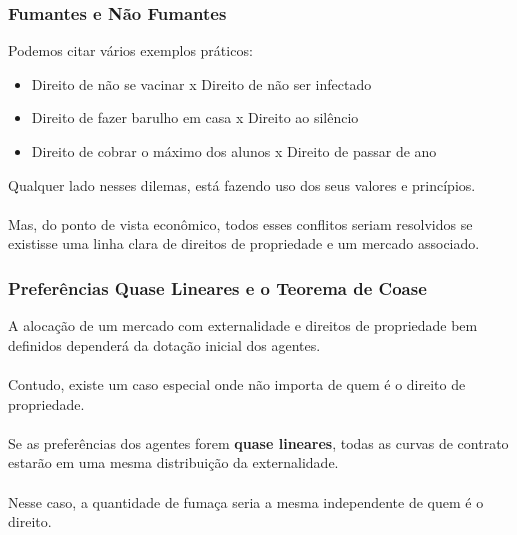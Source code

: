 \documentclass{beamer}[10]
\begin{document}
\begin{frame}
	\frametitle{Fumantes e Não Fumantes}

	Podemos citar vários exemplos práticos:
	\begin{itemize}
		\item Direito de não se vacinar x Direito de não ser infectado
		\item Direito de fazer barulho em casa x Direito ao silêncio
		\item Direito de cobrar o máximo dos alunos x Direito de passar de ano
	\end{itemize}

	Qualquer lado nesses dilemas, está fazendo uso dos seus valores e princípios.
	\\~\\
	Mas, do ponto de vista econômico, todos esses conflitos seriam resolvidos se existisse uma linha clara de direitos de propriedade e um mercado associado.

\end{frame}

\begin{frame}
	\frametitle{Preferências Quase Lineares e o Teorema de Coase}

	A alocação de um mercado com externalidade e direitos de propriedade bem definidos dependerá da dotação inicial dos agentes.
	\\~\\
	Contudo, existe um caso especial onde não importa de quem é o direito de propriedade.
	\\~\\
	Se as preferências dos agentes forem \textbf{quase lineares}, todas as curvas de contrato estarão em uma mesma distribuição da externalidade.
	\\~\\
	Nesse caso, a quantidade de fumaça seria a mesma independente de quem é o direito.

\end{frame}
\end{document}

